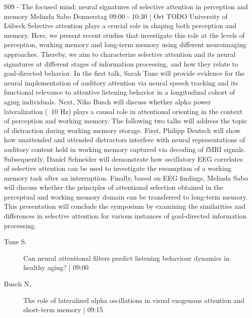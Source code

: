 
            \begin{symposium}
            {S09 - The focused mind: neural signatures of selective attention in perception and memory}
            {Melinda Sabo }
            {Donnerstag 09:00 - 10:30 | Ort TODO}
            {University of Lübeck}
            Selective attention plays a crucial role in shaping both perception and memory. Here, we present recent studies that investigate this role at the levels of perception, working memory and long-term memory using different neuroimaging approaches. Thereby, we aim to characterize selective attention and its neural signatures at different stages of information processing, and how they relate to goal-directed behavior. In the first talk, Sarah Tune will provide evidence for the neural implementation of auditory attention via neural speech tracking and its functional relevance to attentive listening behavior in a longitudinal cohort of aging individuals. Next, Niko Busch will discuss whether alpha power lateralization (~10 Hz) plays a causal role in attentional orienting in the context of perception and working memory. The following two talks will address the topic of distraction during working memory storage. First, Philipp Deutsch will show how unattended and attended distractors interfere with neural representations of auditory content held in working memory captured via decoding of fMRI signals. Subsequently, Daniel Schneider will demonstrate how oscillatory EEG correlates of selective attention can be used to investigate the resumption of a working memory task after an interruption. Finally, based on EEG findings, Melinda Sabo will discuss whether the principles of attentional selection obtained in the perceptual and working memory domain can be transferred to long-term memory. This presentation will conclude the symposium by examining the similarities and differences in selective attention for various instances of goal-directed information processing.
            \begin{description}    
            
                \item [ Tune S.] Can neural attentional filters predict listening behaviour dynamics in healthy aging? \textcolor{mygray}{ | 09:00}    
                
                \item [ Busch N.] The role of lateralized alpha oscillations in visual exogenous attention and short-term memory \textcolor{mygray}{ | 09:15}    
                

\end{description}
\end{symposium}
